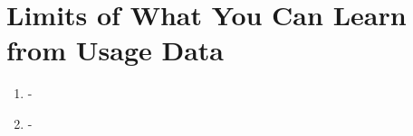 \section{Limits of What You Can Learn from Usage Data}

  \begin{enumerate}
  \item - 
  \item -
  \end{enumerate}